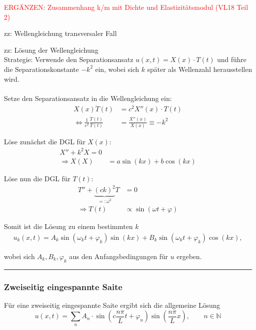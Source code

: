 \documentclass{article}
\newcommand{\lr}[1]{\left(#1\right)}
\begin{document}
{	\textcolor{red}{ERGÄNZEN: Zusammenhang k/m mit Dichte und Elastizitätsmodul (VL18 Teil 2)}
	
	\dotfill
	
	zz: Wellengleichung transversaler Fall\\
	
	\dotfill
	
	zz: Lösung der Wellengleichung\\
	Strategie: Verwende den Separationsansatz $u(x,t) = X(x)\cdot T(t)$ und führe die Separationskonstante $-k^2$ ein, wobei sich $k$ später als Wellenzahl herausstellen wird.\\
	\\
	Setze den Separationsansatz in die Wellengleichung ein:
		\begin{align*}
			X(x) \ddot{T}(t) &= c^2 X''(x)\cdot T(t) \\
			\Leftrightarrow \frac{1}{c^2}\frac{\ddot{T}(t)}{T(t)} &= \frac{X''(x)}{X(x)} \equiv -k^2
		\end{align*}
	
	Löse zunächst die DGL für $X(x)$:
		\begin{align*}
			X'' + k^2 X = 0 \\
			\Rightarrow X(X) &= a\sin(kx) + b\cos(kx)
		\end{align*}
	
	Löse nun die DGL für $T(t)$:
		\begin{align*}
			T'' + \underbrace{ (ck)^2 }_{ =: \omega^2 } T &= 0 \\
			\Rightarrow T(t) &\propto \sin(\omega t + \varphi)
		\end{align*}
	
	Somit ist die Lösung zu einem bestimmten $k$
		\begin{align*}
			u_k(x,t) = A_k \sin(\omega_k t + \varphi_k ) \sin(kx) + B_k \sin( \omega_k t + \varphi_k ) \cos(kx),
		\end{align*}
	
	wobei sich $A_k, B_k, \varphi_k$ aus den Anfangsbedingungen für $u$ ergeben.
\hrule
}


\newpage


\subsubsection{Zweiseitig eingespannte Saite}
Für eine zweiseitig eingespannte Saite ergibt sich die allgemeine Lösung
	\begin{equation}
		u(x,t) = \sum_n A_n \cdot \sin(c \frac{n\pi}{L} t + \varphi_n) \sin\lr{ \frac{n\pi}{L} x}, \qquad n\in \mathbb{N}
	\end{equation}
\end{document}

